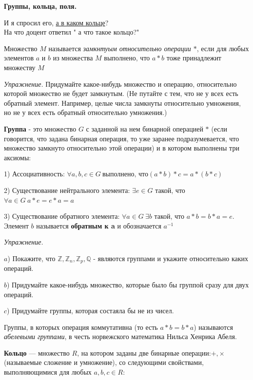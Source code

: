 \hspace{3mm}

\centerline{\bf \Huge Группы, кольца, поля.}

\begin{flushright}
    \scriptsize{И я спросил его, \href{https://www.youtube.com/watch?v=xwvKcWa2vLM}{а в каком кольце}?\\На что доцент ответил  " а что такое кольцо?"\ }
\end{flushright}

Множество $M$ называется \textit{замкнтуым относительно операции $*$}, если для любых элементов $a$ и $b$ из множества $M$ выполнено, что $a*b$ тоже принадлежит множеству $M$

\textit{Упражнение.} Придумайте какое-нибудь множество и операцию, относительно которой множество не будет замкнутым. (Не путайте с тем, что не у всех есть обратный элемент. Например, целые числа замкнуты относительно умножения, но не у всех есть обратный относительно умножения.)

\textbf{Группа} - это множество $G$ с заданной на нем бинарной операцией $*$ (если говорится, что задана бинарная операция, то уже заранее подразумевается, что множество замкнуто относительно этой операции) и в котором выполнены три аксиомы:

1) Ассоциативность: $\forall a, b, c \in G \ \text{выполнено, что} (a*b)*c = a*(b*c)$

2) Существование нейтрального элемента: $\exists e \in G$ такой, что $\forall a \in G \ a*e = e*a = a$

3) Существование обратного элемента: $\forall a \in G \ \exists b $ такой, что $a*b=b*a = e$. Элемент $b$ называется \textbf{обратным к a} и обозначается $a^{-1}$

\textit{Упражнение.} 

$a$) Покажите, что $\mathbb{Z}, \mathbb{Z}_n, \mathbb{Z}_p, \mathbb{Q}$ - являются группами и укажите относительно каких операций. 

$b$) Придумайте какое-нибудь множество, которые было бы группой сразу для двух операций. 

$c$) Придумайте группы, которая состаяла бы не из чисел.

Группы, в которых операция коммутативна (то есть $a*b=b*a$) называются \textit{абелевыми группами}, в честь норвежского математика Нильса Хенрика Абеля.

\textbf{Кольцо} — множество $R$, на котором заданы две бинарные операции:$+, \times$ (называемые сложение и умножение), со следующими свойствами, выполняющимися для любых $a, b, c \in R:$

